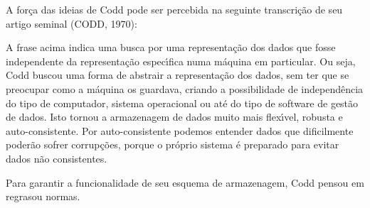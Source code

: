 \documentclass[
12pt,		%
openright,	%
twoside,  %
a4paper,			%
chapter=TITLE,		%
english,			%
french,				%
spanish,			%
brazil				%
]{USPSC-classe/USPSC}
\begin{document}
A for\c{c}a das ideias de Codd pode ser percebida na seguinte transcri\c{c}\~ao de seu artigo seminal (CODD, 1970):


















\noindent\begin{center}\mbox{\centering{}}\end{center}


A frase acima indica uma busca por uma representa\c{c}\~ao dos dados que fosse independente da representa\c{c}\~ao espec\'{\i}fica numa m\'aquina em particular. Ou seja, Codd buscou uma forma de abstrair a representa\c{c}\~ao dos dados, sem ter que se preocupar como a m\'aquina os guardava, criando a possibilidade de independ\^encia do tipo de computador, sistema operacional ou at\'e do tipo de software de gest\~ao de dados. Isto tornou a armazenagem de dados muito mais flex\'{\i}vel, robusta e auto-consistente. Por auto-consistente podemos entender dados que dificilmente poder\~ao sofrer corrup\c{c}\~oes, porque o pr\'oprio sistema \'e preparado para evitar dados n\~ao consistentes.

















Para garantir a funcionalidade de seu esquema de armazenagem, Codd pensou em \textquotedbl regras\textquotedbl  ou normas.
\end{document}
